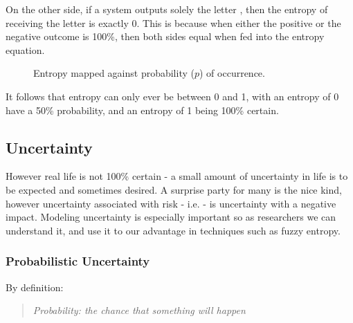 On the other side, if a system outputs solely the letter , then the entropy of receiving the letter  is exactly 0. This is because when either the positive or the negative outcome is 100\%, then both sides equal  when fed into the entropy equation.
\begin{figure}[H]
\begin{center}
\end{center}
\caption{Entropy mapped against probability ($p$) of occurrence.}
\label{fig:entropy}
\end{figure}

It follows that entropy can only ever be between 0 and 1, with an entropy of 0 have a 50\% probability, and an entropy of 1 being 100\% certain.

\subsection{Uncertainty}

However real life is not 100\% certain - a small amount of uncertainty in life is to be expected and sometimes desired. A surprise party for many is the nice kind, however uncertainty associated with risk - i.e.  - is uncertainty with a negative impact. Modeling uncertainty is especially important so as researchers we can understand it, and use it to our advantage in techniques such as fuzzy entropy.

\subsubsection{Probabilistic Uncertainty}

By definition:

\begin{quotation}
  \textit{Probability: the chance that something will happen \cite{PROBABILITY}}
\end{quotation}

